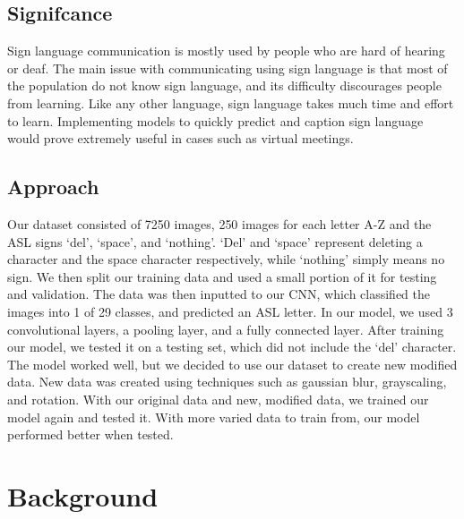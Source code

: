 \documentclass[10pt,twocolumn,letterpaper]{article}
\begin{document}
\subsection{Signifcance}
Sign language communication is mostly used by people who are hard of hearing or deaf.
The main issue with communicating using sign language is that most of the population 
do not know sign language, and its difficulty discourages people from learning. Like any
other language, sign language takes much time and effort to learn. Implementing models to quickly
predict and caption sign language would prove extremely useful in cases such as virtual meetings. 

\subsection{Approach}
Our dataset consisted of 7250 images, 250 images for each letter A-Z and the ASL
signs ‘del’, ‘space’, and ‘nothing’. ‘Del’ and ‘space’ represent deleting a
character and the space character respectively, while ‘nothing’ simply means
no sign. We then split our training data and used a small portion of it for
testing and validation. The data was then inputted to our CNN, which classified
the images into 1 of 29 classes, and predicted an ASL letter. In our model,
we used 3 convolutional layers, a pooling layer, and a fully connected layer.
After training our model, we tested it on a testing set, which did not 
include the ‘del’ character. The model worked well, but we decided to use
our dataset to create new modified data. New data was created using techniques
such as gaussian blur, grayscaling, and rotation. With our original data and 
new, modified data, we trained our model again and tested it. With more varied
data to train from, our model performed better when tested. 


\section{Background}
\end{document}
